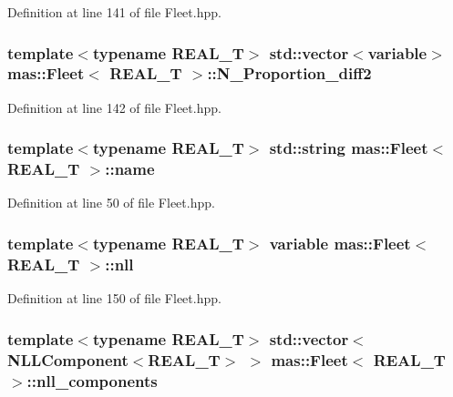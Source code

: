 Definition at line 141 of file Fleet.\-hpp.

\hypertarget{structmas_1_1_fleet_a1f236a57978e3fbd4b59aeae849b00b5}{
\subsubsection[{N\-\_\-\-Proportion\-\_\-diff2}]{\setlength{\rightskip}{0pt plus 5cm}template$<$typename R\-E\-A\-L\-\_\-\-T$>$ std\-::vector$<${\bf variable}$>$ {\bf mas\-::\-Fleet}$<$ R\-E\-A\-L\-\_\-\-T $>$\-::N\-\_\-\-Proportion\-\_\-diff2}}\label{structmas_1_1_fleet_a1f236a57978e3fbd4b59aeae849b00b5}


Definition at line 142 of file Fleet.\-hpp.

\hypertarget{structmas_1_1_fleet_a4c22a8ff3dfa7b1a7684afccfc461c54}{
\subsubsection[{name}]{\setlength{\rightskip}{0pt plus 5cm}template$<$typename R\-E\-A\-L\-\_\-\-T$>$ std\-::string {\bf mas\-::\-Fleet}$<$ R\-E\-A\-L\-\_\-\-T $>$\-::name}}\label{structmas_1_1_fleet_a4c22a8ff3dfa7b1a7684afccfc461c54}


Definition at line 50 of file Fleet.\-hpp.

\hypertarget{structmas_1_1_fleet_a36c9122dc2cb7bb8bf4d2a060c001f2a}{
\subsubsection[{nll}]{\setlength{\rightskip}{0pt plus 5cm}template$<$typename R\-E\-A\-L\-\_\-\-T$>$ {\bf variable} {\bf mas\-::\-Fleet}$<$ R\-E\-A\-L\-\_\-\-T $>$\-::nll}}\label{structmas_1_1_fleet_a36c9122dc2cb7bb8bf4d2a060c001f2a}


Definition at line 150 of file Fleet.\-hpp.

\hypertarget{structmas_1_1_fleet_a41686751b90e9c47278be5df82eb0f3c}{
\subsubsection[{nll\-\_\-components}]{\setlength{\rightskip}{0pt plus 5cm}template$<$typename R\-E\-A\-L\-\_\-\-T$>$ std\-::vector$<${\bf N\-L\-L\-Component}$<$R\-E\-A\-L\-\_\-\-T$>$ $>$ {\bf mas\-::\-Fleet}$<$ R\-E\-A\-L\-\_\-\-T $>$\-::nll\-\_\-components}}\label{structmas_1_1_fleet_a41686751b90e9c47278be5df82eb0f3c}


